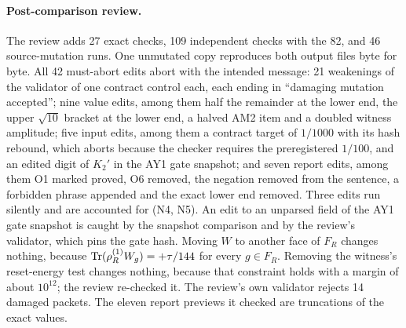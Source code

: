 \paragraph{Post-comparison review.}
The review adds 27 exact checks, 109 independent checks with the 82, and 46
source-mutation runs. One unmutated copy reproduces both output files byte
for byte. All 42 must-abort edits abort with the intended message: 21
weakenings of the validator of one contract control each, each ending in
``damaging mutation accepted''; nine value edits, among them half the
remainder at the lower end, the upper $\sqrt{10}$ bracket at the lower end, a
halved AM2 item and a doubled witness amplitude; five input edits, among them
a contract target of $1/1000$ with its hash rebound, which aborts because the
checker requires the preregistered $1/100$, and an edited digit of $K_2'$ in
the AY1 gate snapshot; and seven report edits, among them O1 marked proved,
O6 removed, the negation removed from the sentence, a forbidden phrase
appended and the exact lower end removed. Three edits run silently and are
accounted for (N4, N5). An edit to an unparsed field of the AY1 gate snapshot
is caught by the snapshot comparison and by the review's validator, which
pins the gate hash. Moving $W$ to another face of $F_R$ changes nothing,
because $\operatorname{Tr}(\rho^{(1)}_RW_g)=+\tau/144$ for every $g\in F_R$. Removing the
witness's reset-energy test changes nothing, because that constraint holds
with a margin of about $10^{12}$; the review re-checked it. The review's own
validator rejects 14 damaged packets. The eleven report previews it checked
are truncations of the exact values.

